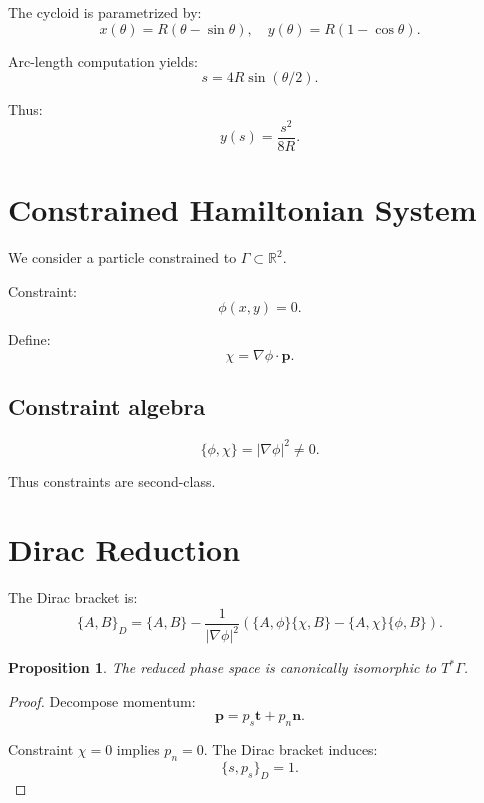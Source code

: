 \documentclass[11pt]{article}
\newtheorem{proposition}{Proposition}
\begin{document}
The cycloid is parametrized by:
\begin{equation}
x(\theta)=R(\theta-\sin\theta), \quad
y(\theta)=R(1-\cos\theta).
\end{equation}

Arc-length computation yields:
\begin{equation}
s = 4R\sin(\theta/2).
\end{equation}

Thus:
\begin{equation}
y(s) = \frac{s^2}{8R}.
\end{equation}

\section{Constrained Hamiltonian System}

We consider a particle constrained to $\Gamma \subset \mathbb{R}^2$.

Constraint:
\[
\phi(x,y)=0.
\]

Define:
\[
\chi = \nabla \phi \cdot \mathbf{p}.
\]

\subsection{Constraint algebra}

\begin{equation}
\{\phi,\chi\} = |\nabla \phi|^2 \neq 0.
\end{equation}

Thus constraints are second-class.

\section{Dirac Reduction}

The Dirac bracket is:
\begin{equation}
\{A,B\}_D = \{A,B\}
- \frac{1}{|\nabla\phi|^2}
(\{A,\phi\}\{\chi,B\} - \{A,\chi\}\{\phi,B\}).
\end{equation}

\begin{proposition}
The reduced phase space is canonically isomorphic to $T^*\Gamma$.
\end{proposition}

\begin{proof}
Decompose momentum:
\[
\mathbf{p} = p_s \mathbf{t} + p_n \mathbf{n}.
\]

Constraint $\chi=0$ implies $p_n=0$. The Dirac bracket induces:
\[
\{s,p_s\}_D = 1.
\]
\end{proof}
\end{document}
